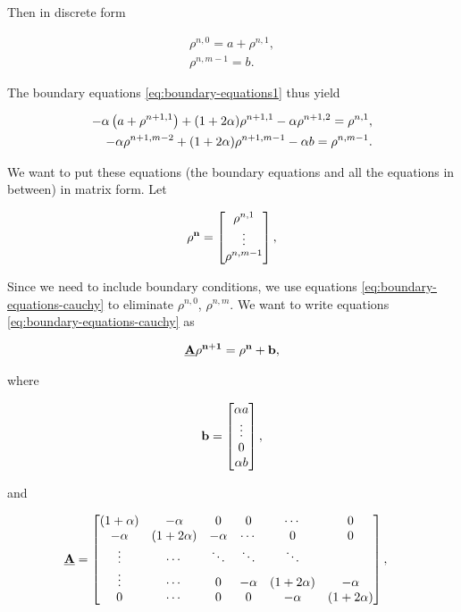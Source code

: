 Then in discrete form 

\begin{align}
    \rho^{n, 0} = a + \rho^{n, 1}, \\
    \rho^{n, m-1} = b.
\end{align}

The boundary equations \ref{eq:boundary-equations1} thus yield

\begin{align}
	\label{eq:boundary-equations-cauchy}
    -\alpha \left({a + \rho^{n+1, 1}}\right)  + ( 1 + 2\alpha ) \rho^{n+1,1} -\alpha \rho^{n+1,2} = \rho^{n,1},\\
    -\alpha \rho^{n+1,m-2} + ( 1 + 2\alpha ) \rho^{n+1,m-1} - \alpha b = \rho^{n,m-1}.
\end{align}

We want to put these equations (the boundary equations and all the equations in between) in matrix form. Let 

\begin{align}
    \bf{\rho^n} = \begin{bmatrix}
                    \rho^{n, 1} \\
                    \vdots \\
                    \rho^{n, m-1} 
                    \end{bmatrix},
\end{align}

Since we need to include boundary conditions, we use equations \ref{eq:boundary-equations-cauchy} to eliminate $\rho^{n, 0}$, $\rho^{n, m}$. We want to write equations \ref{eq:boundary-equations-cauchy} as

\begin{align}
    \bf{\underline{A}} \bf{\rho^{n+1}}  = \bf{\rho^n} + \bf{b},
\end{align}

where

\begin{align}
    \bf{b} = \begin{bmatrix}
                    \alpha a \\
                    \vdots \\
                    0 \\
                    \alpha b 
                    \end{bmatrix},
\end{align}


and 

\begin{align}
\bf{\underline{A}} &= \begin{bmatrix}
           ( 1 + \alpha) & -\alpha  &  0 & 0 &  \cdots & 0\\
             -\alpha & ( 1 + 2 \alpha ) & -\alpha & \cdots & 0 & 0\\
           \vdots  &\cdots  & \ddots & \ddots &  \ddots&  \\
            \vdots & \cdots & 0  &  -\alpha & ( 1 + 2 \alpha ) & -\alpha \\
            0 & \cdots &0  & 0 & -\alpha & ( 1 + 2 \alpha )
         \end{bmatrix},
\end{align}

